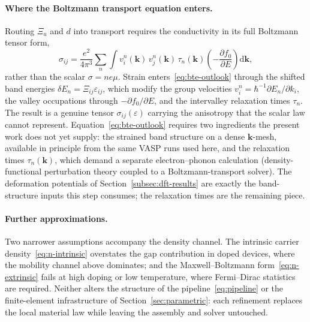 \paragraph{Where the Boltzmann transport equation enters.}
Routing $\Xi_u$ and $d$ into transport requires the conductivity in its full
Boltzmann tensor form,
\begin{equation}
  \sigma_{ij} = \frac{e^2}{4\pi^3}\sum_n \int
  v^n_i(\mathbf k)\,v^n_j(\mathbf k)\,\tau_n(\mathbf k)
  \left(-\frac{\partial f_0}{\partial E}\right)\mathrm d\mathbf k ,
  \label{eq:bte-outlook}
\end{equation}
rather than the scalar $\sigma = ne\mu$. Strain enters~\eqref{eq:bte-outlook}
through the shifted band energies $\delta E_n = \Xi_{ij}\varepsilon_{ij}$, which
modify the group velocities $v^n_i=\hbar^{-1}\partial E_n/\partial k_i$, the
valley occupations through $-\partial f_0/\partial E$, and the intervalley
relaxation times $\tau_n$. The result is a genuine tensor
$\sigma_{ij}(\varepsilon)$ carrying the anisotropy that the scalar law cannot
represent. Equation~\eqref{eq:bte-outlook} requires two ingredients the present
work does not yet supply: the strained band structure on a dense $\mathbf k$-mesh,
available in principle from the same VASP runs used here, and the relaxation times
$\tau_n(\mathbf k)$, which demand a separate electron--phonon calculation
(density-functional perturbation theory coupled to a Boltzmann-transport solver).
The deformation potentials of Section~\ref{subsec:dft-results} are exactly the
band-structure inputs this step consumes; the relaxation times are the remaining
piece.

\paragraph{Further approximations.}
Two narrower assumptions accompany the density channel. The intrinsic carrier
density~\eqref{eq:n-intrinsic} overstates the gap contribution in doped devices,
where the mobility channel above dominates; and the Maxwell--Boltzmann
form~\eqref{eq:n-extrinsic} fails at high doping or low temperature, where
Fermi--Dirac statistics are required. Neither alters the structure of the
pipeline~\eqref{eq:pipeline} or the finite-element infrastructure of
Section~\ref{sec:parametric}: each refinement replaces the local material law
while leaving the assembly and solver untouched.





